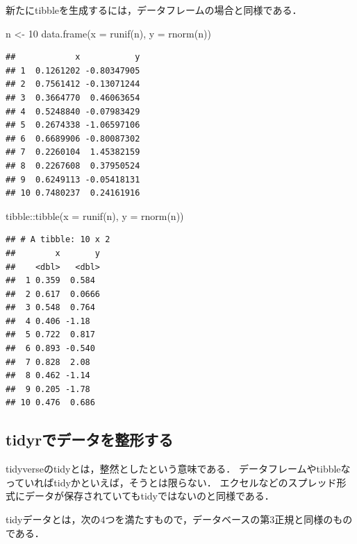 \documentclass[
]{article}
\newenvironment{Shaded}{\begin{snugshade}}{\end{snugshade}}
\newcommand{\AttributeTok}[1]{\textcolor[rgb]{0.77,0.63,0.00}{#1}}
\newcommand{\DecValTok}[1]{\textcolor[rgb]{0.00,0.00,0.81}{#1}}
\newcommand{\FunctionTok}[1]{\textcolor[rgb]{0.00,0.00,0.00}{#1}}
\newcommand{\NormalTok}[1]{#1}
\newcommand{\OtherTok}[1]{\textcolor[rgb]{0.56,0.35,0.01}{#1}}
\newcommand{\SpecialCharTok}[1]{\textcolor[rgb]{0.00,0.00,0.00}{#1}}
\begin{document}
新たにtibbleを生成するには，データフレームの場合と同様である．

\begin{Shaded}
\begin{Highlighting}[]
\NormalTok{n }\OtherTok{\textless{}{-}} \DecValTok{10}
\FunctionTok{data.frame}\NormalTok{(}\AttributeTok{x =} \FunctionTok{runif}\NormalTok{(n), }\AttributeTok{y =} \FunctionTok{rnorm}\NormalTok{(n))}
\end{Highlighting}
\end{Shaded}

\begin{verbatim}
##            x           y
## 1  0.1261202 -0.80347905
## 2  0.7561412 -0.13071244
## 3  0.3664770  0.46063654
## 4  0.5248840 -0.07983429
## 5  0.2674338 -1.06597106
## 6  0.6689906 -0.80087302
## 7  0.2260104  1.45382159
## 8  0.2267608  0.37950524
## 9  0.6249113 -0.05418131
## 10 0.7480237  0.24161916
\end{verbatim}

\begin{Shaded}
\begin{Highlighting}[]
\NormalTok{tibble}\SpecialCharTok{::}\FunctionTok{tibble}\NormalTok{(}\AttributeTok{x =} \FunctionTok{runif}\NormalTok{(n), }\AttributeTok{y =} \FunctionTok{rnorm}\NormalTok{(n))}
\end{Highlighting}
\end{Shaded}

\begin{verbatim}
## # A tibble: 10 x 2
##        x       y
##    <dbl>   <dbl>
##  1 0.359  0.584 
##  2 0.617  0.0666
##  3 0.548  0.764 
##  4 0.406 -1.18  
##  5 0.722  0.817 
##  6 0.893 -0.540 
##  7 0.828  2.08  
##  8 0.462 -1.14  
##  9 0.205 -1.78  
## 10 0.476  0.686
\end{verbatim}

\hypertarget{tidyrux3067ux30c7ux30fcux30bfux3092ux6574ux5f62ux3059ux308b}{%
\subsection{tidyrでデータを整形する}\label{tidyrux3067ux30c7ux30fcux30bfux3092ux6574ux5f62ux3059ux308b}}

tidyverseのtidyとは，整然としたという意味である．
データフレームやtibbleなっていればtidyかといえば，そうとは限らない．
エクセルなどのスプレッド形式にデータが保存されていてもtidyではないのと同様である．

tidyデータとは，次の4つを満たすもので，データベースの第3正規と同様のものである．
\end{document}
